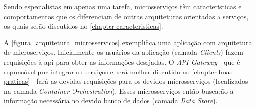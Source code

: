 Sendo especialistas em apenas uma tarefa, microsserviços têm características e comportamentos que os diferenciam de outras arquiteturas orientadas a serviços, os quais serão discutidos no \autoref{chapter-caracteristicas}.

A \autoref{figura_arquitetura_microsservicos} exemplifica uma aplicação com arquitetura de microserviços. Inicialmente os usuários da aplicação (camada \emph{Clients}) fazem requisições à api para obter as informações desejadas. O \emph{API Gateway} - que é reponsável por integrar os serviços e será melhor discutido no \autoref{chapter-boas-praticas} - fará as devidas requisições para os devidos microsserviços (localizados na camada \emph{Container Orchestration}). Esses microsserviços então buscarão a informação necessária no devido banco de dados (camada \emph{Data Store}).




